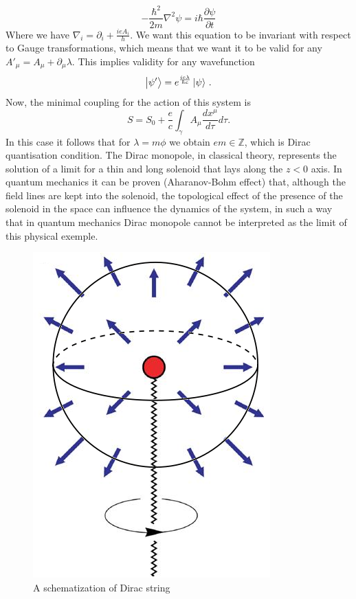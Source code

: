 \documentclass[main.tex]{subfiles}
\begin{document}
\begin{equation}
    -\frac{\hbar^2}{2m}\nabla^2\psi=i\hbar\frac{\partial\psi}{\partial t}
\end{equation}
Where we have $\nabla_i=\partial_i+\frac{ie A_i}{h}$. We want this equation to be invariant with respect to Gauge transformations, which means that we want it to be valid for any $A'_{\mu}=A_{\mu}+\partial_{\mu}\lambda$. This implies validity for any wavefunction
\begin{equation}
\ket{\psi'}=e^{\frac{ie\lambda}{\hbar c}}\ket{\psi}\,.
\end{equation}
Now, the minimal coupling for the action of this system is
\begin{equation}
S=S_0+\frac{e}{c}\int_{\gamma}A_{\mu}\frac{dx^{\mu}}{d\tau}d\tau.
\end{equation}
In this case it follows
that for $\lambda=m\phi$ we obtain $em\in \mathbb{Z}$, which is Dirac quantisation condition. The Dirac monopole, in classical theory, represents the solution of a limit for a thin and long solenoid that lays along the $z<0$ axis. In quantum mechanics it can be proven (Aharanov-Bohm effect) that, although the field lines are kept into the solenoid, the topological effect of the presence of the solenoid in the space can influence the dynamics of the system, in such a way that in quantum mechanics Dirac monopole cannot be interpreted as the limit of this physical exemple.
\begin{figure}[h]
\centering
\includegraphics[scale=0.3]{DiracMon.png}
\caption{A schematization of Dirac string}
\label{fig-DirMon}
\end{figure}
\end{document}

